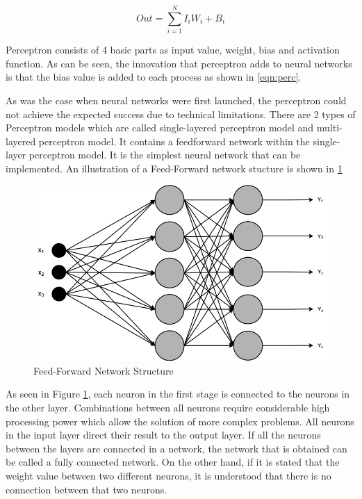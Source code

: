 \begin{equation}
\label{eqn:perc}
    Out = \sum\limits_{i=1}^{N}{I_i W_i+B_i}
\end{equation}

Perceptron consists of 4 basic parts as input value, weight, bias and activation function. As can be seen, the innovation that perceptron adds to neural networks is that the bias value is added to each process as shown in \ref{eqn:perc}.

As was the case when neural networks were first launched, the perceptron could not achieve the expected success due to technical limitations. There are 2 types of Perceptron models which are called single-layered perceptron model and multi-layered perceptron model. It contains a feedforward network within the single-layer perceptron model. It is the simplest neural network that can be implemented. An illustration of a Feed-Forward network stucture is shown in \ref{fig:feed-forwardl}

\begin{figure}[h]
    \centering
    \includegraphics[scale=0.45]{figures/chapter3/FeedForward.png}
    \vspace*{5mm}
    \caption{Feed-Forward Network Structure}
    \label{fig:feed-forwardl}
\end{figure}

As seen in Figure \ref{fig:feed-forwardl}, each neuron in the first stage is connected to the neurons in the other layer. Combinations between all neurons require considerable high processing power which allow the solution of more complex problems. All neurons in the input layer direct their result to the output layer. If all the neurons between the layers are connected in a network, the network that is obtained can be called a fully connected network. On the other hand, if it is stated that the weight value between two different neurons, it is understood that there is no connection between that two neurons.

